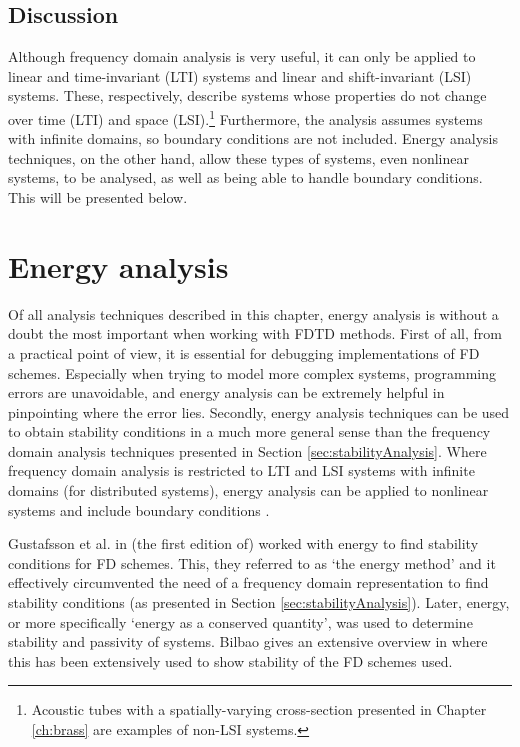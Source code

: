 {{\subsection{Discussion}
Although frequency domain analysis is very useful, it can only be applied to linear and time-invariant (LTI) systems and linear and shift-invariant (LSI) systems. These, respectively, describe systems whose properties do not change over time (LTI) and space (LSI).\footnote{Acoustic tubes with a spatially-varying cross-section presented in Chapter \ref{ch:brass} are examples of non-LSI systems.} Furthermore, the analysis assumes systems with infinite domains, so boundary conditions are not included. Energy analysis techniques, on the other hand, allow these types of systems, even nonlinear systems, to be analysed, as well as being able to handle boundary conditions. This will be presented below.

\section{Energy analysis}\label{sec:energyAnalysis}
Of all analysis techniques described in this chapter, energy analysis is without a doubt the most important when working with FDTD methods. 
First of all, from a practical point of view, it is essential for debugging implementations of FD schemes. Especially when trying to model more complex systems, programming errors are unavoidable, and energy analysis can be extremely helpful in pinpointing where the error lies. 
Secondly, energy analysis techniques can be used to obtain stability conditions in a much more general sense than the frequency domain analysis techniques presented in Section \ref{sec:stabilityAnalysis}. Where frequency domain analysis is restricted to LTI and LSI systems with infinite domains (for distributed systems), energy analysis can be applied to nonlinear systems and include boundary conditions \cite{theBible}. 

Gustafsson et al. in (the first edition of) \cite{Gustafsson2013} worked with energy to find stability conditions for FD schemes. This, they referred to as `the energy method' and it effectively circumvented the need of a frequency domain representation to find stability conditions (as presented in Section \ref{sec:stabilityAnalysis}). Later, energy, or more specifically `energy as a conserved quantity', was used to determine stability and passivity of systems. Bilbao gives an extensive overview in \cite{theBible} where this has been extensively used to show stability of the FD schemes used. 

}}
